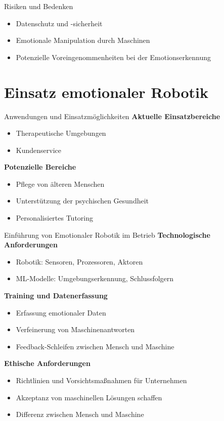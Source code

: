 \documentclass[aspectratio=169]{beamer}
\begin{document}
\begin{frame}{Risiken und Bedenken}
  \begin{itemize}
    \item Datenschutz und -sicherheit
    \item Emotionale Manipulation durch Maschinen
    \item Potenzielle Voreingenommenheiten bei der Emotionserkennung
  \end{itemize}
\end{frame}

\section{Einsatz emotionaler Robotik}
\begin{frame}{Anwendungen und Einsatzmöglichkeiten}
  \textbf{Aktuelle Einsatzbereiche}
  \begin{itemize}
    \item Therapeutische Umgebungen
    \item Kundenservice
  \end{itemize}
  \vspace{1cm}

  \textbf{Potenzielle Bereiche}
  \begin{itemize}
    \item Pflege von älteren Menschen
    \item Unterstützung der psychischen Gesundheit
    \item Personalisiertes Tutoring
  \end{itemize}
\end{frame}

\begin{frame}{Einführung von Emotionaler Robotik im Betrieb}
  \textbf{Technologische Anforderungen}
  \begin{itemize}
    \item Robotik: Sensoren, Prozessoren, Aktoren
    \item ML-Modelle: Umgebungserkennung, Schlussfolgern
  \end{itemize}
  \vspace{.5cm}

  \textbf{Training und Datenerfassung}
  \begin{itemize}
    \item Erfassung emotionaler Daten
    \item Verfeinerung von Maschinenantworten
    \item Feedback-Schleifen zwischen Mensch und Maschine
  \end{itemize}
  \vspace{.5cm}

  \textbf{Ethische Anforderungen}
  \begin{itemize}
    \item Richtlinien und Vorsichtsmaßnahmen für Unternehmen
    \item Akzeptanz von maschinellen Lösungen schaffen
    \item Differenz zwischen Mensch und Maschine
  \end{itemize}
\end{frame}
\end{document}
